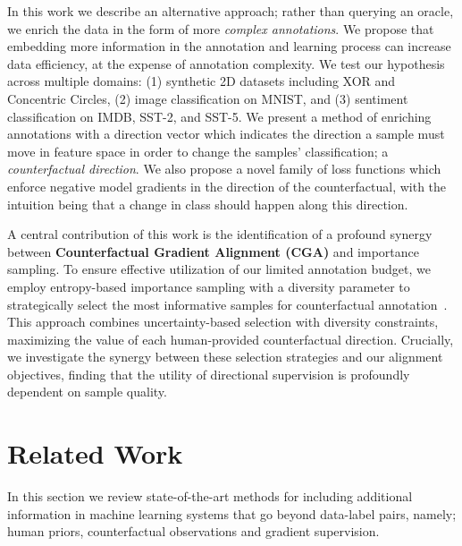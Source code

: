 \documentclass[sigconf,anonymous]{aamas}
\begin{document}
In this work we describe an alternative approach; rather than querying an oracle, we enrich the data in the form of more \emph{complex annotations}. We propose that embedding more information in the annotation and learning process can increase data efficiency, at the expense of annotation complexity. We test our hypothesis across multiple domains: (1) synthetic 2D datasets including XOR and Concentric Circles, (2) image classification on MNIST, and (3) sentiment classification on IMDB, SST-2, and SST-5. We present a method of enriching annotations with a direction vector which indicates the direction a sample must move in feature space in order to change the samples' classification; a \emph{counterfactual direction}. We also propose a novel family of loss functions which enforce negative model gradients in the direction of the counterfactual, with the intuition being that a change in class should happen along this direction. 

A central contribution of this work is the identification of a profound synergy between \textbf{Counterfactual Gradient Alignment (CGA)} and importance sampling. To ensure effective utilization of our limited annotation budget, we employ entropy-based importance sampling with a diversity parameter to strategically select the most informative samples for counterfactual annotation~\cite{he2014active}. This approach combines uncertainty-based selection with diversity constraints, maximizing the value of each human-provided counterfactual direction. Crucially, we investigate the synergy between these selection strategies and our alignment objectives, finding that the utility of directional supervision is profoundly dependent on sample quality.

\section{Related Work}
\label{related_work}

In this section we review state-of-the-art methods for including additional information in machine learning systems that go beyond data-label pairs, namely; human priors, counterfactual observations and gradient supervision.
\end{document}
